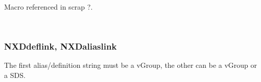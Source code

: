 \documentclass[12pt]{article}
\begin{document}
{\begin{flushleft}
\begin{minipage}{\linewidth}
\begin{list}{}{}
\mbox{}\verb@     @\\
\mbox{}\verb@     /* call NXDgetdef */@\\
\mbox{}\verb@     iRet = NXDgetdef(hFil,dict,GetCharArray(pReplaced),pData);@\\
\mbox{}\verb@     DeleteDynString(pReplaced);@\\
\mbox{}\verb@     return iRet;@\\
\mbox{}\verb@  }@\\
\mbox{}\verb@@$\diamond$
\end{list}
\vspace{-1ex}
\footnotesize\addtolength{\baselineskip}{-1ex}
\begin{list}{}{\setlength{\itemsep}{-\parsep}\setlength{\itemindent}{-\leftmargin}}
\item Macro referenced in scrap ?.
\end{list}
\end{minipage}\\[4ex]
\end{flushleft}
\subsubsection{NXDdeflink, NXDaliaslink}
The first alias/definition string must be a vGroup, the other can be a
vGroup or a SDS.

}
\end{document}
